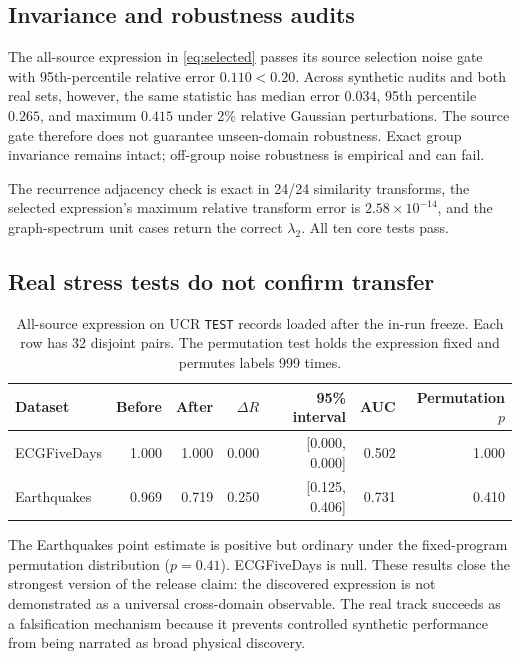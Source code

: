 \documentclass[10pt]{article}
\theoremstyle{definition}
\theoremstyle{remark}
\begin{document}
\subsection{Invariance and robustness audits}

The all-source expression in \cref{eq:selected} passes its source selection noise gate with 95th-percentile relative error $0.110<0.20$. Across synthetic audits and both real sets, however, the same statistic has median error $0.034$, 95th percentile $0.265$, and maximum $0.415$ under 2\% relative Gaussian perturbations. The source gate therefore does not guarantee unseen-domain robustness. Exact group invariance remains intact; off-group noise robustness is empirical and can fail.

The recurrence adjacency check is exact in 24/24 similarity transforms, the selected expression's maximum relative transform error is $2.58\times10^{-14}$, and the graph-spectrum unit cases return the correct $\lambda_2$. All ten core tests pass.

\subsection{Real stress tests do not confirm transfer}

\begin{table}[H]
\centering
\caption{All-source expression on UCR \texttt{TEST} records loaded after the in-run freeze. Each row has 32 disjoint pairs. The permutation test holds the expression fixed and permutes labels 999 times.}
\label{tab:real}
\small
\begin{tabular}{@{}lrrrrrr@{}}
\toprule
Dataset & Before & After & $\Delta R$ & 95\% interval & AUC & Permutation $p$\\
\midrule
ECGFiveDays & 1.000 & 1.000 & 0.000 & [0.000, 0.000] & 0.502 & 1.000\\
Earthquakes & 0.969 & 0.719 & 0.250 & [0.125, 0.406] & 0.731 & 0.410\\
\bottomrule
\end{tabular}
\end{table}

The Earthquakes point estimate is positive but ordinary under the fixed-program permutation distribution ($p=0.41$). ECGFiveDays is null. These results close the strongest version of the release claim: the discovered expression is not demonstrated as a universal cross-domain observable. The real track succeeds as a falsification mechanism because it prevents controlled synthetic performance from being narrated as broad physical discovery.
\end{document}
